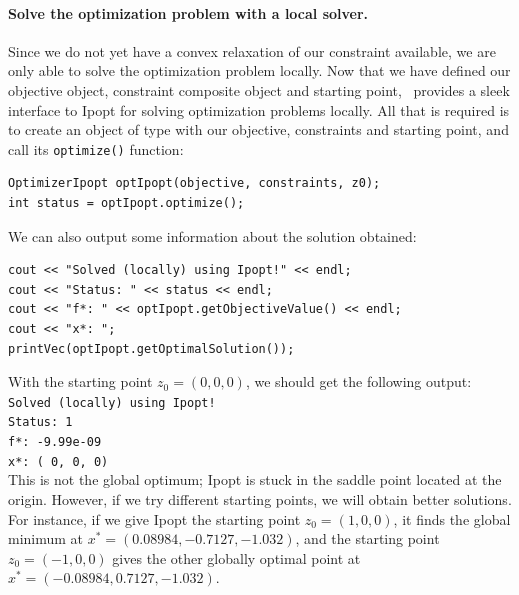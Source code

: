 \paragraph{Solve the optimization problem with a local solver.} Since we do not yet have a convex relaxation of our constraint available, we are only able to solve the optimization problem locally. Now that we have defined our objective object, constraint composite object and starting point, \solvername\ provides a sleek interface to Ipopt for solving optimization problems locally. All that is required is to create an object of type  with our objective, constraints and starting point, and call its \texttt{optimize()} function:
\begin{lstlisting}
OptimizerIpopt optIpopt(objective, constraints, z0);
int status = optIpopt.optimize();
\end{lstlisting}
We can also output some information about the solution obtained:
\begin{lstlisting}
cout << "Solved (locally) using Ipopt!" << endl;
cout << "Status: " << status << endl;
cout << "f*: " << optIpopt.getObjectiveValue() << endl;
cout << "x*: ";
printVec(optIpopt.getOptimalSolution());
\end{lstlisting}
With the starting point $z_0 = (0, 0, 0)$, we should get the following output:
\texttt{
Solved (locally) using Ipopt! \\
Status: 1 \\
f*: -9.99e-09 \\
x*: (     0,      0,      0)} \\
This is not the global optimum; Ipopt is stuck in the saddle point located at the origin. However, if we try different starting points, we will obtain better solutions. For instance, if we give Ipopt the starting point $z_0 = (1, 0, 0)$, it finds the global minimum at $x^* = (0.08984, -0.7127, -1.032)$, and the starting point $z_0 = (-1, 0, 0)$ gives the other globally optimal point at $x^* = (-0.08984, 0.7127, -1.032)$.

